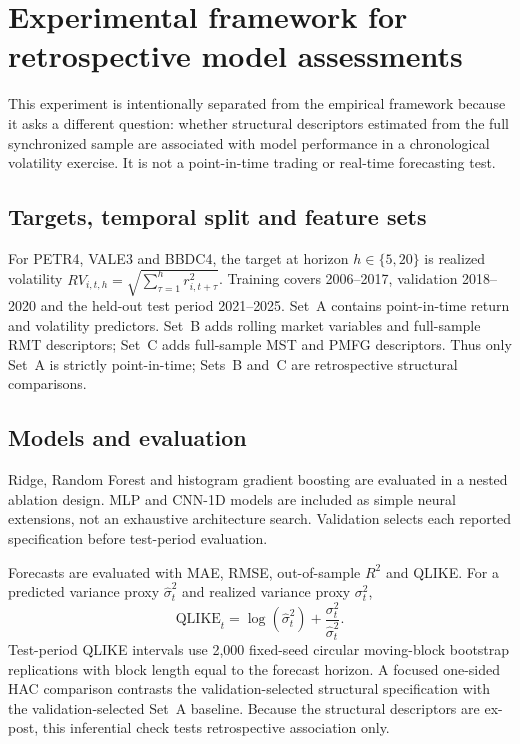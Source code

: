 \section{Experimental framework for retrospective model assessments}
\label{sec:experimental_framework}

This experiment is intentionally separated from the empirical framework because it asks a different question: whether structural descriptors estimated from the full synchronized sample are associated with model performance in a chronological volatility exercise. It is not a point-in-time trading or real-time forecasting test.

\subsection{Targets, temporal split and feature sets}
\label{subsec:forecasting_method}

For PETR4, VALE3 and BBDC4, the target at horizon $h\in\{5,20\}$ is realized volatility $RV_{i,t,h}=\sqrt{\sum_{\tau=1}^{h}r_{i,t+\tau}^{2}}$. Training covers 2006--2017, validation 2018--2020 and the held-out test period 2021--2025. Set~A contains point-in-time return and volatility predictors. Set~B adds rolling market variables and full-sample RMT descriptors; Set~C adds full-sample MST and PMFG descriptors. Thus only Set~A is strictly point-in-time; Sets~B and~C are retrospective structural comparisons.

\subsection{Models and evaluation}
\label{subsec:forecast_models_method}

Ridge, Random Forest and histogram gradient boosting are evaluated in a nested ablation design. MLP and CNN-1D models are included as simple neural extensions, not an exhaustive architecture search. Validation selects each reported specification before test-period evaluation.

\label{subsec:evaluation_method}
Forecasts are evaluated with MAE, RMSE, out-of-sample $R^2$ and QLIKE. For a predicted variance proxy $\hat{\sigma}_t^2$ and realized variance proxy $\sigma_t^2$,
\begin{equation}
\mathrm{QLIKE}_t=\log(\hat{\sigma}_t^2)+\frac{\sigma_t^2}{\hat{\sigma}_t^2}.
\end{equation}
Test-period QLIKE intervals use 2,000 fixed-seed circular moving-block bootstrap replications with block length equal to the forecast horizon. A focused one-sided HAC comparison contrasts the validation-selected structural specification with the validation-selected Set~A baseline. Because the structural descriptors are ex-post, this inferential check tests retrospective association only.
